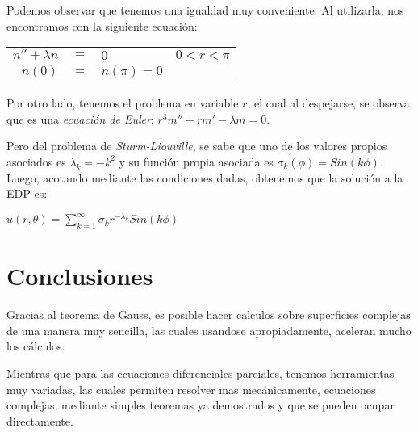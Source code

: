 \documentclass[11pt,letterpaper]{article}
\begin{document}
Podemos observar que tenemos una igualdad muy conveniente. Al utilizarla, nos encontramos con la siguiente ecuación:

\begin{center}
\begin{tabular}{r c l l }
$n''+\lambda n$ & $=$ & $0$ & $0 < r < \pi$\\
$n(0)$ & $=$ & $n(\pi)=0$ &  \\
\end{tabular}
\end{center}

Por otro lado, tenemos el problema en variable $r$, el cual al despejarse, se observa que es una \textit{ecuación de Euler}: $r^3m'' + rm' -\lambda m = 0$.

Pero del problema de \textit{Sturm-Liouville}, se sabe que uno de los valores propios asociados es $\lambda_k = -k^2$ y su función propia asociada es $\sigma_k(\phi)=Sin(k\phi)$. Luego, acotando mediante las condiciones dadas, obtenemos que la solución a la EDP es:

\begin{center}
$u(r,\theta)=\sum\limits_{k=1}^\infty \sigma_k r^{-\lambda_k}Sin(k\phi )$
\end{center}


\section{Conclusiones}
Gracias al teorema de Gauss, es posible hacer calculos sobre superficies complejas de una manera muy sencilla, las cuales usandose apropiadamente, aceleran mucho los cálculos.

Mientras que para las ecuaciones diferenciales parciales, tenemos herramientas muy variadas, las cuales permiten resolver mas mecánicamente, ecuaciones complejas, mediante simples teoremas ya demostrados y que se pueden ocupar directamente.


\end{document}
